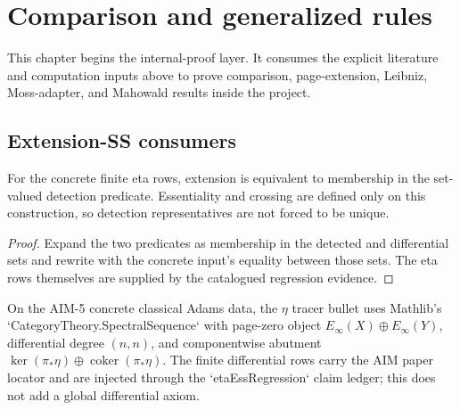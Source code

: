 \chapter{Comparison and generalized rules}
\label{chap:comparison-and-rules}

This chapter begins the internal-proof layer.  It consumes the explicit literature and computation inputs above to prove comparison, page-extension, Leibniz, Moss-adapter, and Mahowald results inside the project.

\section{Extension-SS consumers}

\begin{proposition}
  \label{prop:classical-eta-extension-iff-detected}
  \notready
  For the concrete finite eta rows, extension is equivalent to membership in
  the set-valued detection predicate.  Essentiality and crossing are defined
  only on this construction, so detection representatives are not forced to
  be unique.
\end{proposition}

\begin{proof}
  Expand the two predicates as membership in the detected and differential
  sets and rewrite with the concrete input's equality between those sets.
  The eta rows themselves are supplied by the catalogued regression evidence.
\end{proof}

\begin{definition}
  \label{def:classical-eta-ess-concrete}
  \notready
  On the AIM-5 concrete classical Adams data, the $\eta$ tracer bullet uses
  Mathlib's `CategoryTheory.SpectralSequence` with page-zero object
  $E_\infty(X)\oplus E_\infty(Y)$, differential degree $(n,n)$, and
  componentwise abutment $\ker(\pi_*\eta)\oplus\operatorname{coker}(\pi_*\eta)$.
  The finite differential rows carry the AIM paper locator and are injected
  through the `etaEssRegression` claim ledger; this does not add a global
  differential axiom.
\end{definition}

